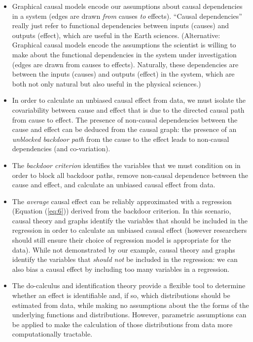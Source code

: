 \documentclass[12pt]{article}
\begin{document}
\begin{itemize}
\item Graphical causal models encode our assumptions about causal
  dependencies in a system (edges are drawn \emph{from} causes
  \emph{to} effects). ``Causal dependencies'' really just refer to
  functional dependencies between inputs (causes) and outputs
  (effect), which are useful in the Earth sciences. (Alternative:
  Graphical causal models encode the assumptions the scientist is
  willing to make about the functional dependencies in the system
  under investigation (edges are drawn from causes to
  effects). Naturally, these dependencies are between the inputs
  (causes) and outputs (effect) in the system, which are both not only
  natural but also useful in the physical sciences.)
\item In order to calculate an unbiased causal effect from data, we
  must isolate the covariability between cause and effect that is due
  to the directed causal path from cause to effect. The presence of
  non-causal dependencies between the cause and effect can be deduced
  from the causal graph: the presence of an \textit{unblocked backdoor
    path} from the cause to the effect leads to non-causal
  dependencies (and co-variation).
\item The \emph{backdoor criterion} identifies the variables that we
  must condition on in order to block all backdoor paths, remove
  non-causal dependence between the cause and effect, and calculate an
  unbiased causal effect from data.
\item The \emph{average} causal effect can be reliably approximated
  with a regression (Equation (\ref{eq:6})) derived from the backdoor
  criterion. In this scenario, causal theory and graphs identify the
  variables that should be included in the regression in order to
  calculate an unbiased causal effect (however researchers should
  still ensure their choice of regression model is appropriate for the
  data). While not demonstrated by our example, causal theory and
  graphs identify the variables that \textit{should not} be included
  in the regression: we can also bias a causal effect by
  including too many variables in a regression.
\item The do-calculus and identification theory provide a flexible
  tool to determine whether an effect is identifiable and, if so,
  which distributions should be estimated from data, while making no
  assumptions about the the forms of the underlying functions and
  distributions. However, parametric assumptions can be applied to
  make the calculation of those distributions from data more
  computationally tractable.
\end{itemize}
\end{document}
